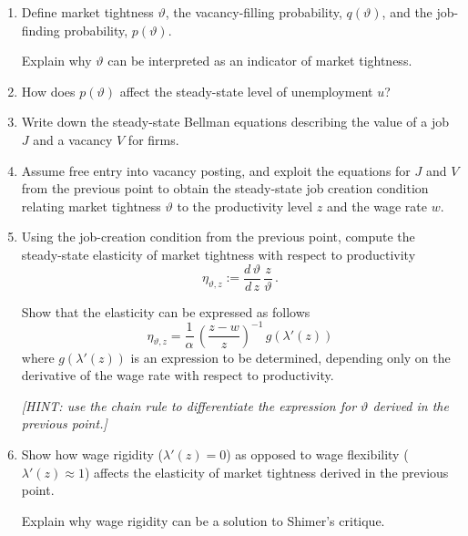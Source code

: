 \documentclass[a4paper,11pt]{article}
\begin{document}
\medskip


    
    \bigskip

\begin{enumerate}
\item Define market tightness $\vartheta$, the vacancy-filling probability, $q(\vartheta)$, and the job-finding probability, $p(\vartheta)$.

Explain why $\vartheta$ can be interpreted as an indicator of market tightness.
    
    \smallskip
    
\item How does $p(\vartheta)$ affect the steady-state level of unemployment $u$?

    
    \smallskip
    
\item Write down the steady-state Bellman equations describing the value of a job $J$ and a vacancy $V$ for firms.
    
    \smallskip
    
\item Assume free entry into vacancy posting, and exploit the equations for $J$ and $V$ from the previous point to obtain the steady-state job creation condition relating market tightness $\vartheta$ to the productivity level $z$ and the wage rate $w$.
    
    \smallskip

\item Using the job-creation condition from the previous point, compute the steady-state elasticity of market tightness with respect to productivity
$$ \eta_{\vartheta,z}:=\frac{d\,\vartheta}{d\,z}\,\frac{z}{\vartheta}\,.$$

Show that the elasticity can be expressed as follows
$$ \eta_{\vartheta,z} = \frac{1}{\alpha}\,\left(\frac{z-w}{z}\right)^{-1}\,g\left(\lambda'(z)\right)$$
where $g\left(\lambda'(z)\right)$ is an expression to be determined, depending only on the derivative of the wage rate with respect to productivity.

\textit{[HINT: use the chain rule to differentiate the expression for $\vartheta$ derived in the previous point.]}
    
    \smallskip

\item Show how wage rigidity ($\lambda'(z)=0$) as opposed to wage flexibility ($\lambda'(z) \approx 1$) affects the elasticity of market tightness derived in the previous point.

Explain why wage rigidity can be a solution to Shimer's critique.

\end{enumerate}
\end{document}
